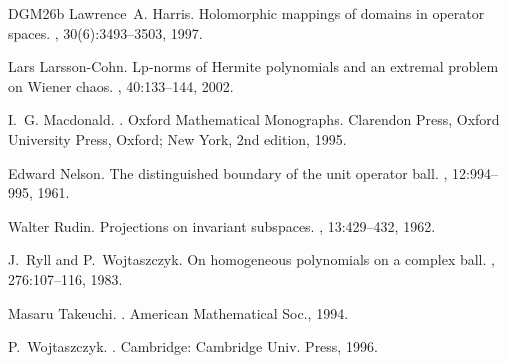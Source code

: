\documentclass[11pt,showkeys]{amsart}
\begin{document}
\begin{thebibliography}{DGM{\etalchar{+}}26b}
Lawrence~A. Harris.
\newblock Holomorphic mappings of domains in operator spaces.
, 30(6):3493--3503, 1997.

Lars Larsson-Cohn.
\newblock Lp-norms of {H}ermite polynomials and an extremal problem on {W}iener chaos.
, 40:133--144, 2002.

I.~G. Macdonald.
.
\newblock Oxford Mathematical Monographs. Clarendon Press, Oxford University Press, Oxford; New York, 2nd edition, 1995.

Edward Nelson.
\newblock The distinguished boundary of the unit operator ball.
, 12:994--995, 1961.

Walter Rudin.
\newblock Projections on invariant subspaces.
, 13:429--432, 1962.

J.~Ryll and P.~Wojtaszczyk.
\newblock On homogeneous polynomials on a complex ball.
, 276:107--116, 1983.

Masaru Takeuchi.
.
\newblock American Mathematical Soc., 1994.

P.~Wojtaszczyk.
.
\newblock Cambridge: Cambridge Univ. Press, 1996.

\end{thebibliography}
\end{document}
